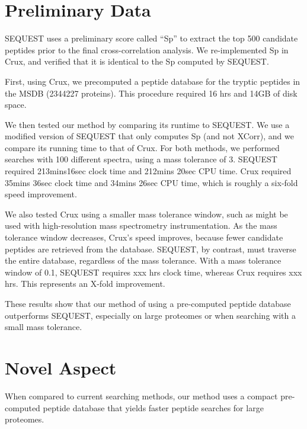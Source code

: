 \documentclass[12pt]{article}
\begin{document}
\section{Preliminary Data}

SEQUEST uses a preliminary score called ``Sp'' to extract the top 500
candidate peptides prior to the final cross-correlation analysis.
We re-implemented Sp in Crux, and verified that it is identical to the
Sp computed by SEQUEST.


First, using Crux, we precomputed a peptide database for the tryptic
peptides in the MSDB (2344227 proteins).  This procedure required 16
hrs and 14GB of disk space.

We then tested our method by comparing its runtime to SEQUEST.  We use
a modified version of SEQUEST that only computes Sp (and not XCorr),
and we compare its running time to that of Crux.  For both methods, we
performed searches with 100 different spectra, using a mass tolerance
of 3.  SEQUEST required 213mins16sec clock time and 212mins 20sec CPU
time.  Crux required 35mins 36sec clock time and 34mins 26sec CPU
time, which is roughly a six-fold speed improvement.

We also tested Crux using a smaller mass tolerance window, such
as might be used with high-resolution mass spectrometry
instrumentation.  As the mass tolerance window decreases, Crux's speed
improves, because fewer candidate peptides are retrieved from the
database.  SEQUEST, by contrast, must traverse the entire database,
regardless of the mass tolerance.  With a mass tolerance window of
0.1, SEQUEST requires xxx hrs clock time, whereas Crux requires xxx
hrs.  This represents an X-fold improvement.

These results show that our method of using a pre-computed peptide
database outperforms SEQUEST, especially on large proteomes or when
searching with a small mass tolerance.

\section{Novel Aspect}

When compared to current searching methods, our method uses a compact
pre-computed peptide database that yields faster peptide searches for
large proteomes.
\end{document}
